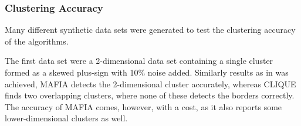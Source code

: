 \subsubsection{Clustering Accuracy}
Many different synthetic data sets were generated to test the clustering accuracy of the algorithms.

The first data set were a 2-dimensional data set containing a single cluster formed as a skewed plus-sign with 10\% noise added. Similarly results as in \cite{mafia} was achieved, MAFIA detects the 2-dimensional cluster accurately, whereas CLIQUE finds two overlapping clusters, where none of these detects the borders correctly. The accuracy of MAFIA comes, however, with a cost, as it also reports some lower-dimensional clusters as well.

